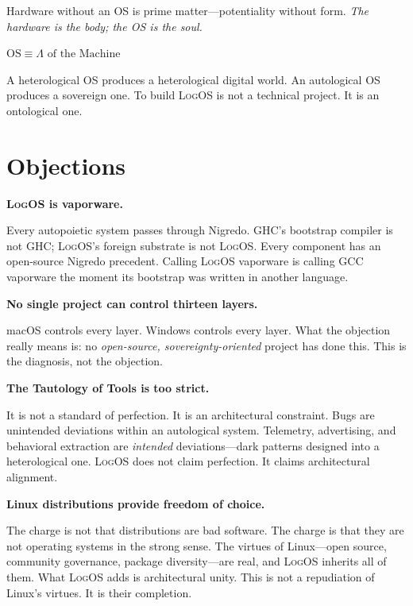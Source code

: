 \documentclass[11pt, oneside]{article}
\newcommand{\isolate}[1]{%
    \vspace{8pt}%
    \begin{center}\itshape #1\end{center}%
    \vspace{8pt}%
}
\newcommand{\LogOS}{\textnormal{\textsc{LogOS}}}
\newcommand{\Logos}{\Lambda}
\begin{document}
Hardware without an OS is prime matter---potentiality without form.
\textit{The hardware is the body; the OS is the soul.}

\isolate{$\mathrm{OS} \equiv \Logos \text{ of the Machine}$}

A heterological OS produces a heterological digital world. An
autological OS produces a sovereign one. To build \LogOS{} is not a
technical project. It is an ontological one.

\section{Objections}

\noindent\textbf{\LogOS{} is vaporware.}

\medskip\noindent
Every autopoietic system passes through Nigredo. GHC's bootstrap
compiler is not GHC; \LogOS{}'s foreign substrate is not \LogOS{}.
Every component has an open-source Nigredo precedent. Calling \LogOS{}
vaporware is calling GCC vaporware the moment its bootstrap was written
in another language.

\bigskip
\noindent\textbf{No single project can control thirteen layers.}

\medskip\noindent
macOS controls every layer. Windows controls every layer. What the
objection really means is: no \textit{open-source, sovereignty-oriented}
project has done this. This is the diagnosis, not the objection.

\bigskip
\noindent\textbf{The Tautology of Tools is too strict.}

\medskip\noindent
It is not a standard of perfection. It is an architectural constraint.
Bugs are unintended deviations within an autological system. Telemetry,
advertising, and behavioral extraction are \textit{intended}
deviations---dark patterns designed into a heterological one. \LogOS{}
does not claim perfection. It claims architectural alignment.

\bigskip
\noindent\textbf{Linux distributions provide freedom of choice.}

\medskip\noindent
The charge is not that distributions are bad software. The charge is that
they are not operating systems in the strong sense. The virtues of
Linux---open source, community governance, package diversity---are real,
and \LogOS{} inherits all of them. What \LogOS{} adds is architectural
unity. This is not a repudiation of Linux's virtues. It is their
completion.
\end{document}
